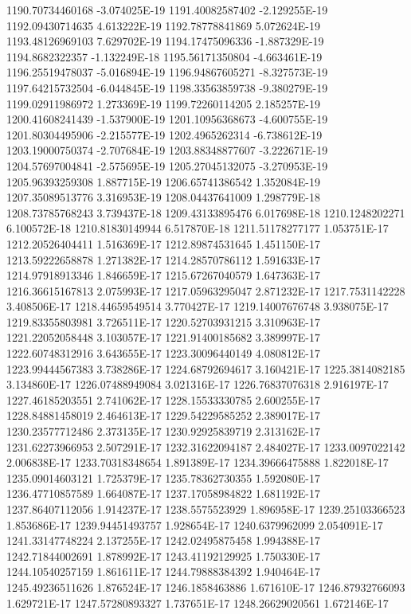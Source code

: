 1190.70734460168  -3.074025E-19
1191.40082587402  -2.129255E-19
1192.09430714635  4.613222E-19
1192.78778841869  5.072624E-19
1193.48126969103  7.629702E-19
1194.17475096336  -1.887329E-19
1194.8682322357  -1.132249E-18
1195.56171350804  -4.663461E-19
1196.25519478037  -5.016894E-19
1196.94867605271  -8.327573E-19
1197.64215732504  -6.044845E-19
1198.33563859738  -9.380279E-19
1199.02911986972  1.273369E-19
1199.72260114205  2.185257E-19
1200.41608241439  -1.537900E-19
1201.10956368673  -4.600755E-19
1201.80304495906  -2.215577E-19
1202.4965262314  -6.738612E-19
1203.19000750374  -2.707684E-19
1203.88348877607  -3.222671E-19
1204.57697004841  -2.575695E-19
1205.27045132075  -3.270953E-19
1205.96393259308  1.887715E-19
1206.65741386542  1.352084E-19
1207.35089513776  3.316953E-19
1208.04437641009  1.298779E-18
1208.73785768243  3.739437E-18
1209.43133895476  6.017698E-18
1210.1248202271  6.100572E-18
1210.81830149944  6.517870E-18
1211.51178277177  1.053751E-17
1212.20526404411  1.516369E-17
1212.89874531645  1.451150E-17
1213.59222658878  1.271382E-17
1214.28570786112  1.591633E-17
1214.97918913346  1.846659E-17
1215.67267040579  1.647363E-17
1216.36615167813  2.075993E-17
1217.05963295047  2.871232E-17
1217.7531142228  3.408506E-17
1218.44659549514  3.770427E-17
1219.14007676748  3.938075E-17
1219.83355803981  3.726511E-17
1220.52703931215  3.310963E-17
1221.22052058448  3.103057E-17
1221.91400185682  3.389997E-17
1222.60748312916  3.643655E-17
1223.30096440149  4.080812E-17
1223.99444567383  3.738286E-17
1224.68792694617  3.160421E-17
1225.3814082185  3.134860E-17
1226.07488949084  3.021316E-17
1226.76837076318  2.916197E-17
1227.46185203551  2.741062E-17
1228.15533330785  2.600255E-17
1228.84881458019  2.464613E-17
1229.54229585252  2.389017E-17
1230.23577712486  2.373135E-17
1230.92925839719  2.313162E-17
1231.62273966953  2.507291E-17
1232.31622094187  2.484027E-17
1233.0097022142  2.006838E-17
1233.70318348654  1.891389E-17
1234.39666475888  1.822018E-17
1235.09014603121  1.725379E-17
1235.78362730355  1.592080E-17
1236.47710857589  1.664087E-17
1237.17058984822  1.681192E-17
1237.86407112056  1.914237E-17
1238.5575523929  1.896958E-17
1239.25103366523  1.853686E-17
1239.94451493757  1.928654E-17
1240.6379962099  2.054091E-17
1241.33147748224  2.137255E-17
1242.02495875458  1.994388E-17
1242.71844002691  1.878992E-17
1243.41192129925  1.750330E-17
1244.10540257159  1.861611E-17
1244.79888384392  1.940464E-17
1245.49236511626  1.876524E-17
1246.1858463886  1.671610E-17
1246.87932766093  1.629721E-17
1247.57280893327  1.737651E-17
1248.26629020561  1.672146E-17
